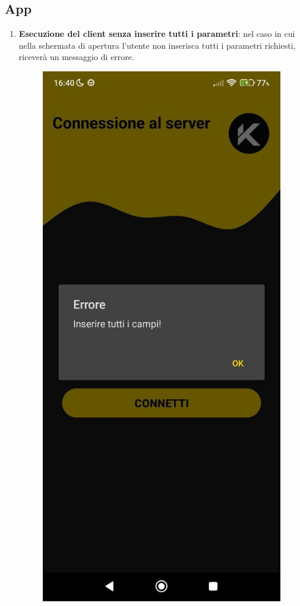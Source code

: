 \subsection{App}
\begin{enumerate}
  \item \textbf{Esecuzione del client senza inserire tutti i parametri}: nel caso in cui nella schermata di apertura l'utente non inserisca tutti i parametri richiesti, riceverà un messaggio di errore.
  \begin{figure}[H]
    \centering
    \includegraphics[scale=0.2]{img/app3.png}

\end{figure}
\end{enumerate}
